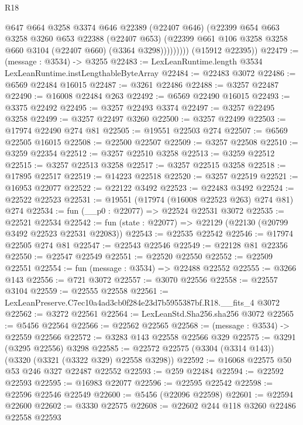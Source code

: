 \begin{lexlean}{R18}
\begin{coremodule}
                  @647
                  @664
                  @3258
                  @3374
                  @646
                  @22389
                  (@22407 @646)
                  (@22399
                    @654
                    @663
                    @3258
                    @3260
                    @653
                    @22388
                    (@22407 @653)
                    (@22399 @661 @106 @3258 @3258 @660 @3104 (@22407 @660) (@3364 @3298)))))))))
      (@15912 @22395))
@22479 := (message : @3534) -> @3255
@22483 := LexLeanRuntime.length @3534 LexLeanRuntime.instLengthableByteArray
@22484 := @22483 @3072
@22486 := @6569 @22484 @16015
@22487 := @3261 @22486
@22488 := @3257 @22487
@22490 := @16008 @22484 @263
@22492 := @6569 @22490 @16015
@22493 := @3375 @22492
@22495 := @3257 @22493 @3374
@22497 := @3257 @22495 @3258
@22499 := @3257 @22497 @3260
@22500 := @3257 @22499
@22503 := @17974 @22490 @274 @81
@22505 := @19551 @22503 @274
@22507 := @6569 @22505 @16015
@22508 := @22500 @22507
@22509 := @3257 @22508
@22510 := @3259 @22354
@22512 := @3257 @22510 @3258
@22513 := @3259 @22512
@22515 := @3257 @22513 @3258
@22517 := @3257 @22515 @3258
@22518 := @17895 @22517
@22519 := @14223 @22518
@22520 := @3257 @22519
@22521 := @16953 @22077
@22522 := @22122 @3492
@22523 := @22483 @3492
@22524 := @22522 @22523
@22531 := @19551 (@17974 (@16008 @22523 @263) @274 @81) @274
@22534 := fun (__p0 : @22077) => @22524 @22531 @3072
@22535 := @22521 @22534
@22542 := fun (state : @22077) => @22129 (@22130 (@20799 @3492 @22523 @22531 @22083))
@22543 := @22535 @22542
@22546 := @17974 @22505 @274 @81
@22547 := @22543 @22546
@22549 := @22128 @81 @22356
@22550 := @22547 @22549
@22551 := @22520 @22550
@22552 := @22509 @22551
@22554 := fun (message : @3534) => @22488 @22552
@22555 := @3266 @143
@22556 := @721 @3072
@22557 := @3070 @22556
@22558 := @22557 @3104
@22559 := @22555 @22558
@22561 := LexLeanPreserve.C7ec10a4ad3cb0f284e23d7b5955387bf.R18.__fits_4 @3072
@22562 := @3272 @22561
@22564 := LexLeanStd.Sha256.sha256 @3072
@22565 := @5456 @22564
@22566 := @22562 @22565
@22568 := (message : @3534) -> @22559 @22566
@22572 := @3283 @143 @22558 @22566 @329
@22575 := @3291 (@3295 @22556) @3298
@22585 := @22572 @22575 (@3304 (@3314 @143)) (@3320 (@3321 (@3322 @329) @22558 @3298))
@22592 := @16068 @22575 @50 @53 @246 @327 @22487 @22552
@22593 := @259 @22484
@22594 := @22592 @22593
@22595 := @16983 @22077
@22596 := @22595 @22542
@22598 := @22596 @22546 @22549
@22600 := @5456 (@22096 @22598)
@22601 := @22594 @22600
@22602 := @3330 @22575
@22608 := @22602 @244 @118 @3260 @22486 @22558 @22593

\end{coremodule}
\end{lexlean}

